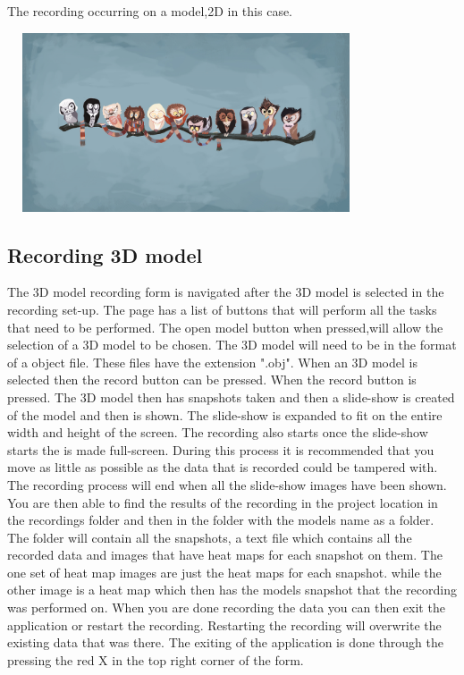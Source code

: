 The recording occurring on a model,2D in this case.

\includegraphics[width=400px,height=200px]{./Images/ModelDisplay.PNG}\\

\subsection{Recording 3D model}
The 3D model recording form is navigated after the 3D model is selected in the recording set-up. The page has a list of buttons that will perform all the tasks that need to be performed. The open model button when pressed,will allow the selection of a 3D model to be chosen. The 3D model will need to be in the format of a object file. These files have the extension ".obj". When an 3D model is selected then the record button can be pressed. When the record button is pressed. The 3D model then has snapshots taken and then a slide-show is created of the model and then is shown. The slide-show is expanded to fit on the entire width and height of the screen. The recording also starts once the slide-show starts the is made full-screen. During this process it is recommended that you move as little as possible as the data that is recorded could be tampered with. The recording process will end when all the slide-show images have been shown. You are then able to find the results of the recording in the project location in the recordings folder and then in the folder with the models name as a folder. The folder will contain all the snapshots, a text file which contains all the recorded data and images that have heat maps for each snapshot on them. The one set of heat map images are just the heat maps for each snapshot. while the other image is a heat map which then has the models snapshot that the recording was performed on. When you are done recording the data you can then exit the application or restart the recording. Restarting the recording will overwrite the existing data that was there. The exiting of the application is done through the pressing the red X in the top right corner of the form.


